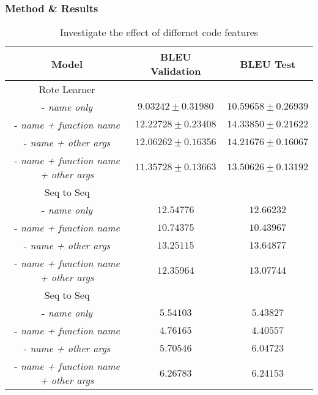 \subsubsection{Method \& Results} %




\begin{table}[!ht]
\begin{center}
\begin{tabular}{ c | c | c }
    Model                               & BLEU Validation            & BLEU Test  \\
    \hline
    \hline
    Rote Learner                        &                  & \\    
    - \textit{name only}                & $ 9.03242  \pm  0.31980 $ & $ 10.59658 \pm 0.26939 $  \\
    - \textit{name + function name}     & $ 12.22728 \pm  0.23408 $ & $ 14.33850 \pm 0.21622 $  \\
    - \textit{name + other args}        & $ 12.06262 \pm  0.16356 $ & $ 14.21676 \pm 0.16067 $  \\
    - \textit{name + function name + other args}  & $ 11.35728 \pm  0.13663 $ & $ 13.50626 \pm 0.13192 $ \\
    \hline
    \hline
    Seq to Seq                          &                  & \\
    - \textit{name only}                & $ 12.54776 $ & $ 12.66232 $  \\
    - \textit{name + function name}     & $ 10.74375 $ & $ 10.43967 $  \\
    - \textit{name + other args}        & $ 13.25115 $ & $ 13.64877 $  \\
    - \textit{name + function name + other args}    & $ 12.35964 $ & $ 13.07744 $  \\

    \hdashline
    Seq to Seq                          &                  & \\
    - \textit{name only}                & $ 5.54103 $ & $ 5.43827 $  \\
    - \textit{name + function name}     & $ 4.76165 $ & $ 4.40557 $  \\
    - \textit{name + other args}        & $ 5.70546 $ & $ 6.04723 $  \\
    - \textit{name + function name + other args}     & $ 6.26783 $ & $ 6.24153 $ \\
    
    \hline
\end{tabular}
\caption {Investigate the effect of differnet code features}
\label{table:tokenization}
\end{center}
\end{table}





